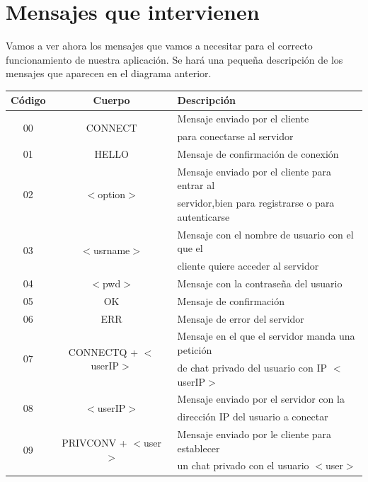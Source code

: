 \documentclass[12pt]{article}       %
\begin{document}
\section{Mensajes que intervienen}

Vamos a ver ahora los mensajes que vamos a necesitar para el correcto funcionamiento de nuestra aplicación. Se hará una pequeña descripción de los mensajes que aparecen en el diagrama anterior.

\begin{center}
\begin{tabular}{|c|c|l|}

\hline
Código & Cuerpo & Descripción \\
\hline
\hline
\multirow{2}{*}{00} & \multirow{2}{*}{CONNECT} &  Mensaje enviado por el cliente\\
					&						   &  para conectarse al servidor\\
\hline
01 & HELLO &  Mensaje de confirmación de conexión\\
\hline
\multirow{2}{*}{02} & \multirow{2}{*}{$<$option$>$} &  Mensaje enviado por el cliente para entrar al\\
					&							&servidor,bien para registrarse o para autenticarse\\
\hline
\multirow{2}{*}{03} & \multirow{2}{*}{$<$usrname$>$} &  Mensaje con el nombre de usuario con el que el\\
					&								 &cliente quiere acceder al servidor\\
\hline
04 & $<$pwd$>$ &  Mensaje con la contraseña del usuario\\
\hline
05 & OK &  Mensaje de confirmación\\
\hline
06 & ERR &  Mensaje de error del servidor\\
\hline
\multirow{2}{*}{07} & \multirow{2}{*}{CONNECTQ + $<$userIP$>$} &  Mensaje en el que el servidor manda una petición\\
				   &										  & de chat privado del usuario con IP $<$userIP$>$ \\
\hline
\multirow{2}{*}{08} & \multirow{2}{*}{$<$userIP$>$} &  Mensaje enviado por el servidor con la\\
					&								&  dirección IP del usuario a conectar\\
\hline
\multirow{2}{*}{09} & \multirow{2}{*}{PRIVCONV + $<$user$>$} & Mensaje enviado por le cliente para establecer\\
					&										 & un chat privado con el usuario $<$user$>$\\
\hline

\end{tabular}
\end{center}
\end{document}
